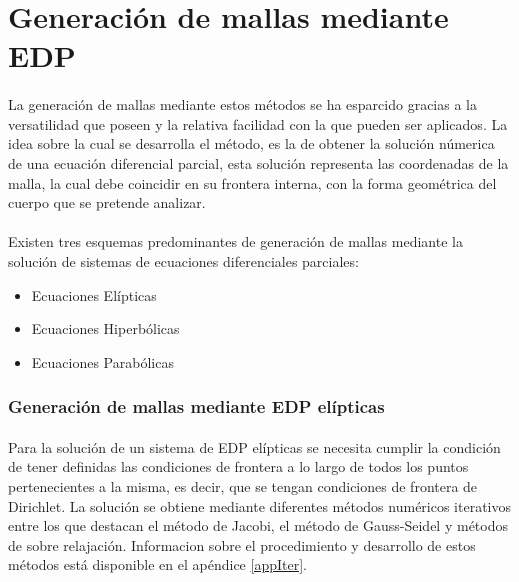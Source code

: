 \documentclass[letterpaper, openright, 12pt]{book}
\begin{document}
\section{Generación de mallas mediante EDP}
    \paragraph*{}
        La generación de mallas mediante estos métodos se ha esparcido gracias a
        la versatilidad que poseen y la relativa facilidad con la que pueden ser
        aplicados. La idea sobre la cual se desarrolla el método, es la de
        obtener la solución númerica de una ecuación diferencial parcial, esta
        solución representa las coordenadas de la malla, la cual debe coincidir
        en su frontera interna, con la forma geométrica del cuerpo que se
        pretende analizar.\cite{siladicParabolic}

    \paragraph*{}
        Existen tres esquemas predominantes de generación de mallas mediante la
        solución de sistemas de ecuaciones diferenciales parciales:
        \begin{itemize}
            \item Ecuaciones Elípticas
            \item Ecuaciones Hiperbólicas
            \item Ecuaciones Parabólicas
        \end{itemize}

    \subsubsection{Generación de mallas mediante EDP elípticas}
    \paragraph*{}
        Para la solución de un sistema de EDP elípticas se necesita cumplir la
        condición de tener definidas las condiciones de frontera a lo largo de
        todos los puntos pertenecientes a la misma, es decir, que se tengan
        condiciones de frontera de Dirichlet.
        La solución se obtiene mediante diferentes métodos numéricos iterativos
        entre los que destacan el método de Jacobi, el método de Gauss-Seidel y
        métodos de sobre relajación. Informacion sobre el procedimiento y
        desarrollo de estos métodos está disponible en el apéndice \ref{appIter}.
\end{document}
